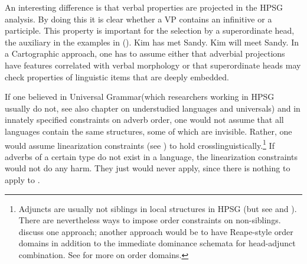 \documentclass[output=paper,biblatex,babelshorthands,newtxmath,draftmode,colorlinks,citecolor=brown]{langscibook}
\begin{document}
An interesting difference is that verbal properties are projected in the HPSG analysis. By doing
this it is clear whether a VP contains an infinitive or a participle.
This property is important for the selection by a superordinate head, \eg the auxiliary in the examples
in (). 
\eal
\ex Kim has met Sandy.
\ex Kim will meet Sandy.
\zl
\largerpage 
In a Cartographic approach, one has to assume either that adverbial projections have
features correlated with verbal morphology or that superordinate heads may check
properties of linguistic items that are deeply embedded.

If one believed in Universal Grammar\indexug (which researchers working
in HPSG usually do not, see also  chapter on
  understudied languages and universals) and in innately specified constraints on adverb order, one would not assume
that all languages contain the same structures, some of which are
invisible. Rather, one would assume linearization constraints (see
) to hold crosslinguistically.\footnote{%
  Adjuncts are usually not siblings in local structures in HPSG (but see \citealt{Kasper94a} and
  \citealt[, 71]{BvN98a}). There are nevertheless ways to
  impose order constraints on non-siblings. \citet*{EEU92a} discuss one approach; another approach
  would be to have Reape-style order domains \citep{Reape94a} in addition to the immediate dominance
  schemata for head-adjunct combination. See  for more on order domains.
} If adverbs
of a certain type do not exist in a language, the linearization constraints would not do any
harm. They just would never apply, since there is nothing to apply to \citep[]{MuellerCoreGram}.
\end{document}
